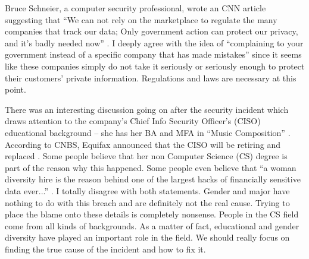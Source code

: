 \documentclass[12pt]{article}
\begin{document}
Bruce Schneier, a computer security professional, wrote an CNN article suggesting that ``We can not rely on the marketplace to regulate the many companies that track our data; Only government action can protect our privacy, and it's badly needed now'' \cite{CNN}. I deeply agree with the idea of ``complaining to your government instead of a specific company that has made mistakes'' since it seems like these companies simply do not take it seriously or seriously enough to protect their customers' private information. Regulations and laws are necessary at this point.  

There was an interesting discussion going on after the security incident which draws attention to the company's Chief Info Security Officer's (CISO) educational background -- she has her BA and MFA in ``Music Composition'' \cite{CE}. According to CNBS, Equifax announced that the CISO will be retiring and replaced \cite{ES}. Some people believe that her non Computer Science (CS) degree is part of the reason why this happened. Some people even believe that ``a woman diversity hire is the reason behind one of the largest hacks of financially sensitive data ever...'' \cite{AC}. I totally disagree with both statements. Gender and major have nothing to do with this breach and are definitely not the real cause. Trying to place the blame onto these details is completely nonsense. People in the CS field come from all kinds of backgrounds. As a matter of fact, educational and gender diversity have played an important role in the field. We should really focus on finding the true cause of the incident and how to fix it.

\newpage


\end{document}

